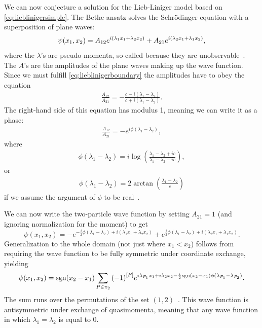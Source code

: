 \documentclass[11pt, a4paper]{report} %
\begin{document}
We can now conjecture a solution for the Lieb-Liniger model based on \cref{eq:lieblinigersimple}.
The Bethe ansatz solves the Schrödinger equation with a superposition of plane waves:
\begin{equation}
	\psi(x_1,x_2) = A_{12} e^{i\qty(\lambda_1x_1 + \lambda_2 x_2)} + A_{21} e^{i(\lambda_2 x_1 + \lambda_1 x_2)},
\end{equation}
where the \(\lambda\)'s are pseudo-momenta, so-called because they are unobservable~\cite{Franchini2017}.
The \(A\)'s are the amplitudes of the plane waves making up the wave function.
Since we must fulfill \cref{eq:lieblinigerboundary} the amplitudes have to obey the equation
\begin{align}
	\frac{A_{12}}{A_{21}} = -\frac{c-i(\lambda_1 - \lambda_2) }{c+i(\lambda_1 - \lambda_2)}.
\end{align}
The right-hand side of this equation has modulus 1, meaning we can write it as a phase:
\begin{align}
	\frac{A_{12}}{A_{21}} = -e^{i\phi(\lambda_1-\lambda_2)},
\end{align}
where~\cite{Korepin1993}
\begin{align}
  \phi(\lambda_1-\lambda_2) = i \log(\frac{\lambda_1-\lambda_2 + ic}{\lambda_1-\lambda_2-ic}),
\end{align}
or
\begin{align}
	\phi(\lambda_1-\lambda_2) = 2\arctan\left(\frac{\lambda_1-\lambda_2}{c}\right)
\end{align}
if we assume the argument of \(\phi\) to be real~\cite{Panfil2014}.

We can now write the two-particle wave function by setting \(A_{21}=1\) (and ignoring normalization for the moment) to get
\begin{equation}
	\psi(x_1,x_2) = - e^{-\frac{i}{2}\phi(\lambda_1-\lambda_2)+i(\lambda_1x_1 + \lambda_2 x_2)} + e^{\frac{i}{2}\phi(\lambda_1-\lambda_2)+i(\lambda_2 x_1 + \lambda_1 x_2)}.
\end{equation}
Generalization to the whole domain (not just where \(x_1 < x_2\)) follows from requiring the wave function to be fully symmetric under coordinate exchange, yielding
\begin{equation}
  \psi\qty(x_1,x_2) = \textrm{sgn}(x_2-x_1)\sum_{P\in\pi_2} {(-1)}^{[P]} e^{i\lambda_{P_1}x_1 + i \lambda_2 x_2- \frac{i}{2} \textrm{sgn}(x_2-x_1)\phi(\lambda_{P_1}-\lambda_{P_2})}.
\end{equation}
The sum runs over the permutations of the set \((1,2)\)~\cite{Caux2015}.
This wave function is antisymmetric under exchange of quasimomenta, meaning that any wave function in which \(\lambda_1=\lambda_2\) is equal to 0.
\end{document}
